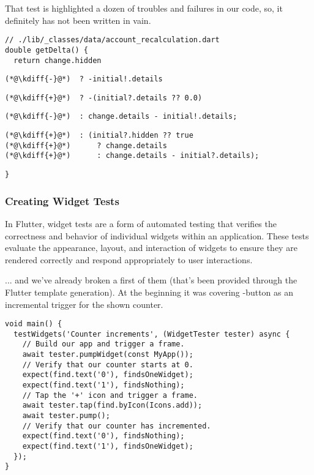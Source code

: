 \noindent That test is highlighted a dozen of troubles and failures in our code, so, it definitely has not been 
written in vain.

\begin{lstlisting}[firstnumber=17]
// ./lib/_classes/data/account_recalculation.dart
double getDelta() {
  return change.hidden
\end{lstlisting}
{
\xpretocmd{\lstlisting}{\vspace{-12pt}}{}{}
\begin{lstlisting}[firstnumber=20, backgroundcolor=\color{backred}]
(*@\kdiff{-}@*)  ? -initial!.details
\end{lstlisting}
\begin{lstlisting}[firstnumber=20, backgroundcolor=\color{backgreen}]
(*@\kdiff{+}@*)  ? -(initial?.details ?? 0.0)
\end{lstlisting}
\begin{lstlisting}[firstnumber=21, backgroundcolor=\color{backred}]
(*@\kdiff{-}@*)  : change.details - initial!.details;
\end{lstlisting}
\begin{lstlisting}[firstnumber=21, backgroundcolor=\color{backgreen}]
(*@\kdiff{+}@*)  : (initial?.hidden ?? true
(*@\kdiff{+}@*)      ? change.details
(*@\kdiff{+}@*)      : change.details - initial?.details);
\end{lstlisting}
\begin{lstlisting}[firstnumber=24]
}
\end{lstlisting}
}


\subsubsection{Creating Widget Tests} \label{widget-tests}

In Flutter, widget tests are a form of automated testing that verifies the correctness and behavior of individual 
widgets within an application. These tests evaluate the appearance, layout, and interaction of widgets to ensure they 
are rendered correctly and respond appropriately to user interactions.

\noindent ... and we've already broken a first of them (that's been provided through the Flutter template generation). 
At the beginning it was covering -button as an incremental trigger for the shown counter.

\begin{lstlisting}
void main() {
  testWidgets('Counter increments', (WidgetTester tester) async {
    // Build our app and trigger a frame.
    await tester.pumpWidget(const MyApp());
    // Verify that our counter starts at 0.
    expect(find.text('0'), findsOneWidget);
    expect(find.text('1'), findsNothing);
    // Tap the '+' icon and trigger a frame.
    await tester.tap(find.byIcon(Icons.add));
    await tester.pump();
    // Verify that our counter has incremented.
    expect(find.text('0'), findsNothing);
    expect(find.text('1'), findsOneWidget);
  });
}
\end{lstlisting}

